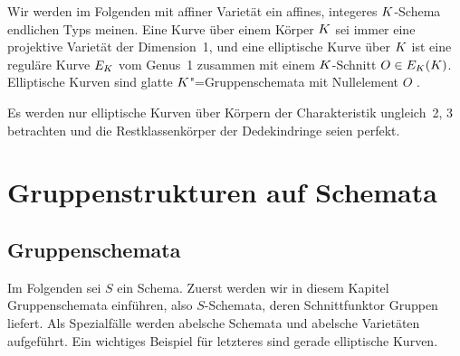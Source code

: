 \documentclass[german, bibliography=totoc]{scrreprt}
\begin{document}
Wir werden im Folgenden mit affiner Varietät ein
affines, integeres $K$-Schema endlichen Typs meinen.
Eine Kurve über einem Körper $K$ sei immer eine projektive Varietät
der Dimension~1,
und eine elliptische Kurve über $K$ ist eine reguläre Kurve $E_{K}$
vom Genus~1 zusammen mit einem $K$-Schnitt $O\in E_{K}(K)$.
Elliptische Kurven sind glatte \cite[Proposition III.3.1]{silverman}
$K$"=Gruppenschemata mit Nullelement $O$ \cite{silverman}.

Es werden nur elliptische Kurven über Körpern der Charakteristik
ungleich~2, 3 betrachten und die Restklassenkörper der Dedekindringe
seien perfekt.


\chapter{Gruppenstrukturen auf Schemata}
\label{chap:gruppenstrukturenaufschemata}
\section{Gruppenschemata}
Im Folgenden sei $S$ ein Schema.
Zuerst werden wir in diesem Kapitel Gruppenschemata einführen, also
$S$-Schemata, deren Schnittfunktor Gruppen liefert. Als Spezialfälle
werden abelsche Schemata und abelsche Varietäten aufgeführt. Ein
wichtiges Beispiel für letzteres sind gerade elliptische Kurven.
\end{document}
